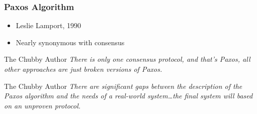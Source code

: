 \begin{frame}
    \frametitle{Paxos Algorithm}
    \begin{itemize}
        \item Leslie Lamport, 1990
        \item Nearly synonymous with consensus
    \end{itemize}
    \begin{block}{The Chubby Author}
        \emph{There is only one consensus protocol, and that's Paxos, all other approaches are just broken versions of Paxos.} \\
    \end{block}
    \begin{block}{The Chubby Author}
        \emph{There are significant gaps between the description of the Paxos algorithm and the needs of a real-world system\ldots the final system will based on an unproven protocol.}
    \end{block}
\end{frame}
